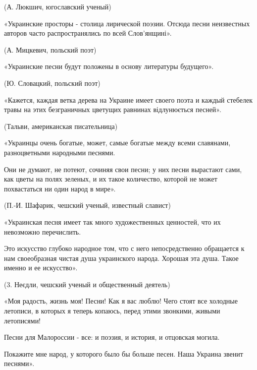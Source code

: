(А. Люкшич, югославский ученый)



«Украинские просторы - столица лирической поэзии. Отсюда песни неизвестных авторов часто распространялись по всей Слов'янщині».



(А. Мицкевич, польский поэт)



«Украинские песни будут положены в основу литературы будущего».



(Ю. Словацкий, польский поэт)



«Кажется, каждая ветка дерева на Украине имеет своего поэта и каждый стебелек травы на этих безграничных цветущих равнинах відлунюється песней».



(Тальви, американская писательница)



«Украинцы очень богатые, может, самые богатые между всеми славянами, разноцветными народными песнями.



Они не думают, не потеют, сочиняя свои песни; у них песни вырастают сами, как цветы на полях зеленых, и их такое количество, которой не может похвастаться ни один народ в мире».



(П.-И. Шафарик, чешский ученый, известный славист)



«Украинская песня имеет так много художественных ценностей, что их невозможно перечислить.



Это искусство глубоко народное том, что с него непосредственно обращается к нам своеобразная чистая душа украинского народа. Хорошая эта душа. Такое именно и ее искусство».



(3. Неєдли, чешский ученый и общественный деятель)



«Моя радость, жизнь моя! Песни! Как я вас люблю! Чего стоят все холодные летописи, в которых я теперь копаюсь, перед этими звонкими, живыми летописями!



Песни для Малороссии - все: и поэзия, и история, и отцовская могила.



Покажите мне народ, у которого было бы больше песен. Наша Украина звенит песнями».




